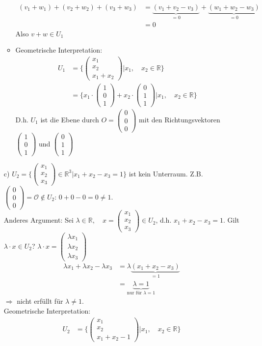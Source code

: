 \documentclass[12pt, titlepage]{article}
\newcommand{\R}{\mathds{R}}
\renewcommand{\vec}[1]{\left(\begin{array}{c}#1
	\end{array}\right)}
\renewcommand{\O}{\mathcal{O}}
\renewcommand{\>}{\rightarrow}
\renewcommand{\*}{\cdot}
\begin{document}
\begin{itemize}
\begin{itemize}
		\begin{align*}
			(v_1+w_1)+(v_2+w_2)+(v_3+w_3)&=\underbrace{(v_1+v_2-v_3)}_{=0}+\underbrace{(w_1+w_2-w_3)}_{=0}\\
			&=0
		\end{align*}
		Also $v+w\in U_1$
		\item Geometrische Interpretation:\\ \begin{align*}
		U_1&=\{\vec{x_1\\x_2\\x_1+x_2}|x_1,\quad x_2\in\R\}\\
		&=\{x_1\*\vec{1\\0\\1}+x_2\*\vec{0\\1\\1}|x_1,\quad x_2\in\R\}
		\end{align*}
		D.h. $U_1$ ist die Ebene durch $O=\vec{0\\0\\0}$ mit den Richtungsvektoren $\vec{1\\0\\1}$ und $\vec{0\\1\\1}$
	\end{itemize}
	\item[c)] $U_2=\{\vec{x_1\\x_2\\x_3}\in\R^3|x_1+x_2-x_3=1\}$ ist kein Unterraum. Z.B. $\vec{0\\0\\0}=\O\notin U_2$: $0+0-0=0\neq1$.\\
	Anderes Argument: Sei $\lambda\in\R,\quad x=\vec{x_1\\x_2\\x_3}\in U_2$, d.h. $x_1+x_2-x_3=1$. Gilt $\lambda\*x\in U_2$? $\lambda\*x=\vec{\lambda x_1\\\lambda x_2\\\lambda x_3}$
	\begin{align*}
		\lambda x_1+\lambda x_2-\lambda x_3&=\lambda\underbrace{(x_1+x_2-x_3)}_{=1}\\
		&=\underbrace{\lambda=1}_{\textrm{nur für }\lambda=1}
	\end{align*}
	$\Rightarrow$ nicht erfüllt für $\lambda\neq1$.\\
	Geometrische Interpretation:\\
	\begin{align*}
		U_2&=\{\vec{x_1\\x_2\\x_1+x_2-1}|x_1,\quad x_2\in\R\}\\

\end{align*}
\end{itemize}
\end{document}
